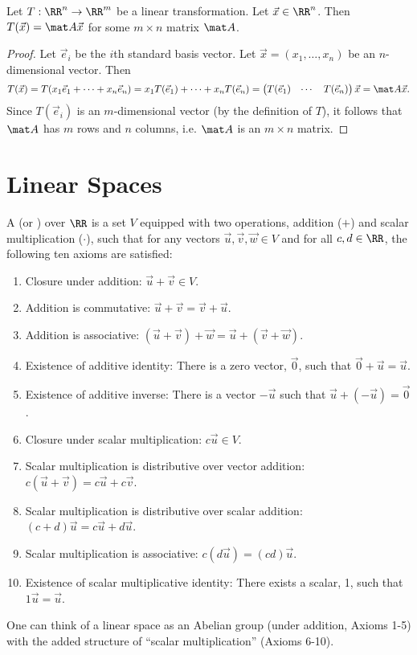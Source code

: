 \begin{proposition}
    Let $T : \RR^n \to \RR^m$ be a linear transformation. Let $\vec x \in \RR^n$. Then $T(\vec x) = \mat A \vec x$ for some $m \times n$ matrix $\mat A$.
\end{proposition}
\begin{proof}
    Let $\vec e_i$ be the $i$th standard basis vector. Let $\vec x = (x_1, \dots, x_n)$ be an $n$-dimensional vector. Then \[T(\vec x) = T(x_1 \vec e_1 + \dots + x_n \vec e_n) = x_1 T(\vec e_1) + \dots + x_n T(\vec e_n) = \begin{pmatrix}T(\vec e_1) & \cdots & T(\vec e_n)\end{pmatrix} \vec x = \mat A \vec x.\] Since $T(\vec e_i)$ is an $m$-dimensional vector (by the definition of $T$), it follows that $\mat A$ has $m$ rows and $n$ columns, i.e. $\mat A$ is an $m \times n$ matrix.
\end{proof}

\section{Linear Spaces}

\begin{definition}
    A  (or ) over $\RR$ is a set $V$ equipped with two operations, addition ($+$) and scalar multiplication ($\cdot$), such that for any vectors $\vec u, \vec v, \vec w \in V$ and for all $c, d \in \RR$, the following ten axioms are satisfied:
    \renewcommand{\theenumi}{\arabic{enumi}.}%
    \begin{enumerate}
        \item Closure under addition: $\vec u + \vec v \in V$.
        \item Addition is commutative: $\vec u + \vec v = \vec v + \vec u$.
        \item Addition is associative: $(\vec u + \vec v) + \vec w = \vec u + (\vec v + \vec w)$.
        \item Existence of additive identity: There is a zero vector, $\vec 0$, such that $\vec 0 + \vec u = \vec u$.
        \item Existence of additive inverse: There is a vector $-\vec u$ such that $\vec u + (-\vec u) = \vec 0$.
        \item Closure under scalar multiplication: $c\vec u \in V$.
        \item Scalar multiplication is distributive over vector addition: $c(\vec u + \vec v) = c \vec u + c \vec v$.
        \item Scalar multiplication is distributive over scalar addition: $(c + d) \vec u = c \vec u + d \vec u$.
        \item Scalar multiplication is associative: $c(d \vec u) = (cd) \vec u$.
        \item Existence of scalar multiplicative identity: There exists a scalar, 1, such that $1 \vec u = \vec u$.
    \end{enumerate}
    \renewcommand{\theenumi}{(\alph{enumi})}
\end{definition}

One can think of a linear space as an Abelian group (under addition, Axioms 1-5) with the added structure of ``scalar multiplication'' (Axioms 6-10).